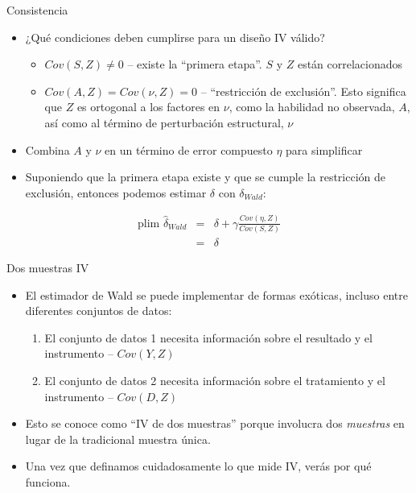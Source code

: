 \documentclass{beamer}
\begin{document}
\begin{frame}{Consistencia}

    \begin{itemize}
    \item ¿Qué condiciones deben cumplirse para un diseño IV válido?
        \begin{itemize}
        \item  $Cov(S,Z)\neq{0}$ -- existe la ``primera etapa''. $S$ y $Z$ están correlacionados 
        \item $Cov(A,Z)=Cov(\nu ,Z)=0$ -- ``restricción de exclusión''. Esto significa que $Z$ es ortogonal a los factores en $\nu$, como la habilidad no observada, $A$, así como al término de perturbación estructural, $\nu$
        \end{itemize}
    \item Combina $A$ y $\nu$ en un término de error compuesto $\eta$ para simplificar
    \item Suponiendo que la primera etapa existe y que se cumple la restricción de exclusión, entonces podemos estimar $\delta$ con $\delta_{Wald}$:
    \end{itemize}
    \begin{eqnarray*}
    \text{plim }\widehat{\delta}_{Wald}&=& \delta + \gamma \frac{Cov(\eta,Z)}{Cov(S,Z)} \\
    &=&\delta
    \end{eqnarray*}
\end{frame}


\begin{frame}{Dos muestras IV}

	\begin{itemize}
	\item El estimador de Wald se puede implementar de formas exóticas, incluso entre diferentes conjuntos de datos:
		\begin{enumerate}
		\item El conjunto de datos 1 necesita información sobre el resultado y el instrumento -- $Cov(Y,Z)$
		\item El conjunto de datos 2 necesita información sobre el tratamiento y el instrumento -- $Cov(D,Z)$
		\end{enumerate}
	\item Esto se conoce como ``IV de dos muestras'' porque involucra dos \emph{muestras} en lugar de la tradicional muestra única.
	\item Una vez que definamos cuidadosamente lo que mide IV, verás por qué funciona.
	\end{itemize}
\end{frame}
\end{document}
